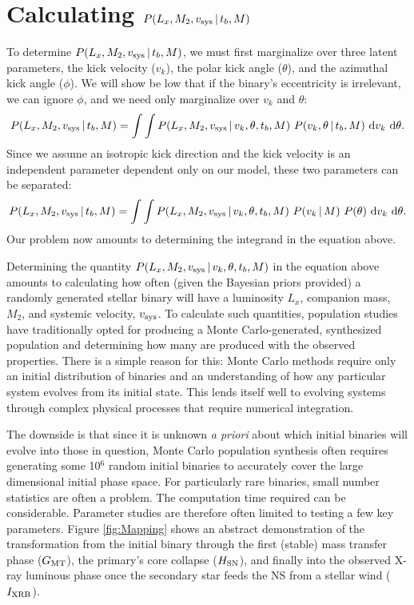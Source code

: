 \documentclass[12pt, preprint]{aastex}
\newcommand{\given}{\,|\,}
\newcommand{\dd}{\mathrm{d}}
\begin{document}
 
\section{Calculating $P(L_x, M_2, v_{\rm sys} \given t_b, M)$} \label{sec:P_L_x}

To determine $P(L_x, M_2, v_{\rm sys} \given t_b, M)$, we must first marginalize over three latent parameters, the kick velocity ($v_k$), the polar kick angle ($\theta$), and the azimuthal kick angle ($\phi$). We will show be low that if the binary's eccentricity is irrelevant, we can ignore $\phi$, and we need only marginalize over $v_k$ and $\theta$:
\begin{equation}
P(L_x, M_2, v_{\rm sys} \given t_b, M) = \int \int P(L_x, M_2, v_{\rm sys} \given v_k, \theta, t_b, M)\ P(v_k, \theta \given t_b, M)\ \dd v_k\ \dd \theta.
\end{equation}
Since we assume an isotropic kick direction and the kick velocity is an independent parameter dependent only on our model, these two parameters can be separated:
\begin{equation}
P(L_x, M_2, v_{\rm sys} \given t_b, M) = \int \int P(L_x, M_2, v_{\rm sys} \given v_k, \theta, t_b, M)\ P(v_k \given M)\ P(\theta)\ \dd v_k\ \dd \theta. \label{eq:P_marginalized}
\end{equation}
Our problem now amounts to determining the integrand in the equation above.


Determining the quantity $P(L_x, M_2, v_{\rm sys} \given v_k, \theta, t_b, M)$ in the equation above amounts to calculating how often (given the Bayesian priors provided) a randomly generated stellar binary will have a luminosity $L_x$, companion mass, $M_2$, and systemic velocity, $v_{\rm sys}$. To calculate such quantities, population studies have traditionally opted for producing a Monte Carlo-generated, synthesized population and determining how many are produced with the observed properties. There is a simple reason for this: Monte Carlo methods require only an initial distribution of binaries and an understanding of how any particular system evolves from its initial state. This lends itself well to evolving systems through complex physical processes that require numerical integration. 


The downside is that since it is unknown {\it a priori} about which initial binaries will evolve into those in question, Monte Carlo population synthesis often requires generating some 10$^6$ random initial binaries to accurately cover the large dimensional initial phase space. For particularly rare binaries, small number statistics are often a problem. The computation time required can be considerable. Parameter studies are therefore often limited to testing a few key parameters. Figure \ref{fig:Mapping} shows an abstract demonstration of the transformation from the initial binary through the first (stable) mass transfer phase ($G_{\rm MT}$), the primary's core collapse ($H_{\rm SN}$), and finally into the observed X-ray luminous phase once the secondary star feeds the NS from a stellar wind ($I_{\rm XRB}$).
\end{document}
